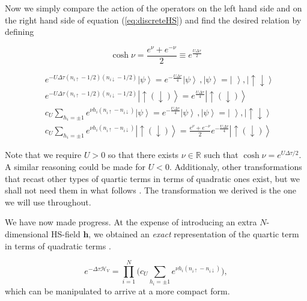 Now we simply compare the action of the operators on the left hand side and on the right hand side of equation (\ref{eq:discreteHS}) and find the desired relation by defining

\begin{equation}
\cosh \nu =  \frac{e^\nu + e^{-\nu} }{2} \equiv e^{\frac{U\Delta \tau}{2}}
\end{equation}

\begin{equation}
\begin{split}
&e^{-U \Delta\tau (n_{i\uparrow} - 1/2 ) (n_{i\downarrow} - 1/2 )} \left| \psi \right\rangle = e^{-\frac{U\Delta \tau}{4}} \left| \psi \right\rangle \, , \left| \psi \right\rangle = \left| \, \, \right\rangle, \left| \uparrow \downarrow \right\rangle \\
&e^{-U \Delta\tau (n_{i\uparrow} - 1/2 ) (n_{i\downarrow} - 1/2 )} \left| \uparrow (\downarrow) \right\rangle = e^{\frac{U\Delta \tau}{4}} \left| \uparrow (\downarrow) \right\rangle \\
&c_U \sum_{h_i = \pm 1} e^{\nu h_i (n_{i\uparrow} - n_{i\downarrow} )} \left| \psi \right\rangle = e^{-\frac{U\Delta \tau}{4}} \left| \psi \right\rangle \, , \left| \psi \right\rangle = \left| \, \, \right\rangle, \left| \uparrow \downarrow \right\rangle \\
&c_U \sum_{h_i = \pm 1} e^{\nu h_i (n_{i\uparrow} - n_{i\downarrow} )} \left| \uparrow (\downarrow) \right\rangle= \frac{e^\nu + e^{-\nu}}{2} e^{-\frac{U\Delta \tau}{4}}  \left| \uparrow (\downarrow) \right\rangle
\end{split}
\end{equation}

Note that we require $U > 0$ so that there exists $\nu \in \mathbb{R}$ such that $\cosh \nu = e^{U\Delta \tau / 2}$. A similar reasoning could be made for $U < 0$. Additionaly, other transformations that recast other types of quartic terms in terms of quadratic ones exist, but we shall not need them in what follows \cite{Hirsch1983}. The transformation we derived is the one we will use throughout.

We have now made progress. At the expense of introducing an extra $N$-dimensional HS-field $\bm h$, we obtained an \emph{exact} representation of the quartic term in terms of quadratic terms \cite{Bai2006}.

\begin{equation} 
 e^{-\Delta\tau \mathcal{H}_V} = \prod_{i=1}^N \bigg( c_U \sum_{h_i = \pm 1} e^{\nu h_i ( n_{i\uparrow} - n_{i\downarrow} )} \bigg),
\end{equation} 
which can be manipulated to arrive at a more compact form.

